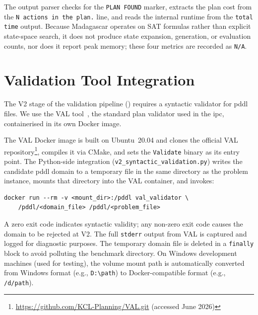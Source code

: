 The output parser checks for the \texttt{PLAN FOUND} marker, extracts the plan cost from the \texttt{N actions in the plan.} line, and reads the internal runtime from the \texttt{total time} output.
Because Madagascar operates on SAT formulas rather than explicit state-space search, it does not produce state expansion, generation, or evaluation counts, nor does it report peak memory; these four metrics are recorded as \texttt{N/A}.


\section{Validation Tool Integration}
\label{sec:impl:val}

The V2 stage of the validation pipeline () requires a syntactic validator for \gls{pddl} files.
We use the VAL tool~\cite{HoweyLongFox2004}, the standard plan validator used in the \gls{ipc}, containerised in its own Docker image.

The VAL Docker image is built on Ubuntu~20.04 and clones the official VAL repository\footnote{\url{https://github.com/KCL-Planning/VAL.git} (accessed June 2026)}, compiles it via CMake, and sets the \texttt{Validate} binary as its entry point.
The Python-side integration (\texttt{v2\_syntactic\_validation.py}) writes the candidate \gls{pddl} domain to a temporary file in the same directory as the problem instance, mounts that directory into the VAL container, and invokes:

\begin{lstlisting}[language={}, basicstyle=\small\ttfamily, numbers=none, frame=none, xleftmargin=0.5cm, breaklines=true]
docker run --rm -v <mount_dir>:/pddl val_validator \
    /pddl/<domain_file> /pddl/<problem_file>
\end{lstlisting}

A zero exit code indicates syntactic validity; any non-zero exit code causes the domain to be rejected at V2.
The full \texttt{stderr} output from VAL is captured and logged for diagnostic purposes.
The temporary domain file is deleted in a \texttt{finally} block to avoid polluting the benchmark directory.
On Windows development machines (used for testing), the volume mount path is automatically converted from Windows format (e.g., \texttt{D:\textbackslash path}) to Docker-compatible format (e.g., \texttt{/d/path}).


